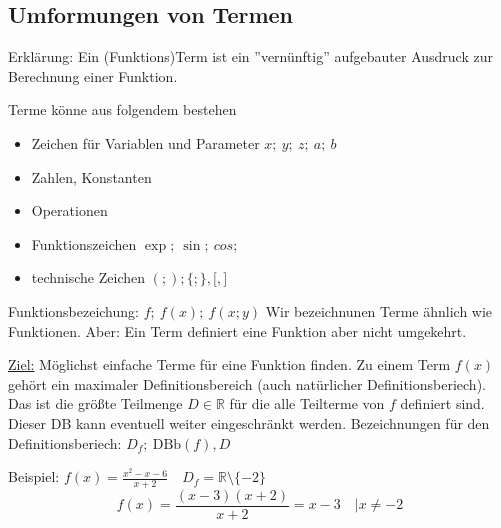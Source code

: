 \subsection{Umformungen von Termen}
Erklärung: Ein (Funktions)Term ist ein ''vernünftig'' aufgebauter Ausdruck zur Berechnung einer Funktion.

Terme könne aus folgendem bestehen
\begin{itemize}
    \item Zeichen für Variablen und Parameter $x;\ y;\ z;\ a;\ b$
    \item Zahlen, Konstanten
    \item Operationen
    \item Funktionszeichen $\exp;\ \sin;\ cos;\ $
    \item technische Zeichen $(;);\lbrace;\rbrace,\lbrack,\rbrack$
\end{itemize}
Funktionsbezeichung: $f;\ f(x);\ f(x;y)$ Wir bezeichnunen Terme ähnlich wie Funktionen. Aber: Ein Term definiert eine Funktion aber nicht umgekehrt.


\underline{Ziel:} Möglichst einfache Terme für eine Funktion finden. Zu einem Term $f(x)$ gehört ein maximaler Definitionsbereich (auch natürlicher Definitionsberiech). Das ist die größte Teilmenge $D \in \mathbb{R}$ für die alle Teilterme von $f$ definiert sind. Dieser DB kann eventuell weiter eingeschränkt werden. Bezeichnungen für den Definitionsberiech: $D_f;\ \textrm{DBb}(f), D$


Beispiel: $f(x) = \frac{x^2-x-6}{x+2}\quad D_f=\mathbb{R}\setminus\lbrace-2\rbrace$
$$f(x)= \frac{(x-3)(x+2)}{x+2} = x-3\quad | x \not = -2$$

